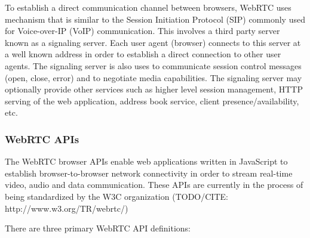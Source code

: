 \documentclass{acmtog} %
\begin{document}
To establish a direct communication channel between browsers, WebRTC
uses mechanism that is similar to the Session Initiation Protocol
(SIP) commonly used for Voice-over-IP (VoIP) communication. This
involves a third party server known as a signaling server. Each user
agent (browser) connects to this server at a well known address in
order to establish a direct connection to other user agents. The
signaling server is also uses to communicate session control messages
(open, close, error) and to negotiate media capabilities. The signaling
server may optionally provide other services such as higher level
session management, HTTP serving of the web application, address book
service, client presence/availability, etc.

\subsubsection{WebRTC APIs}

The WebRTC browser APIs enable web applications written in JavaScript
to establish browser-to-browser network connectivity in order to
stream real-time video, audio and data communication. These APIs are
currently in the process of being standardized by the W3C organization
(TODO/CITE: http://www.w3.org/TR/webrtc/)

There are three primary WebRTC API definitions:
\end{document}
